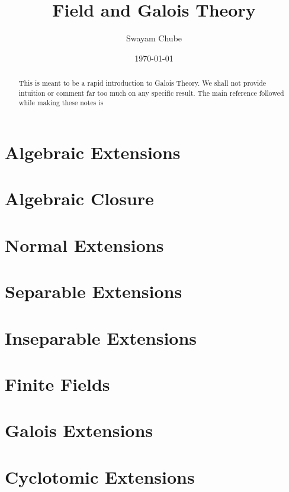 \documentclass{report}
\title{Field and Galois Theory}
\author{Swayam Chube}
\date{\today}
\begin{document}
\maketitle

\begin{abstract}
    This is meant to be a rapid introduction to Galois Theory. We shall not provide intuition or comment far too much on any specific result. The main reference followed while making these notes is \cite{Lan02}
\end{abstract}

\tableofcontents

\chapter{Algebraic Extensions}
 

\chapter{Algebraic Closure}


\chapter{Normal Extensions}


\chapter{Separable Extensions}


\chapter{Inseparable Extensions}


\chapter{Finite Fields}


\chapter{Galois Extensions}


\chapter{Cyclotomic Extensions}

\end{document}
